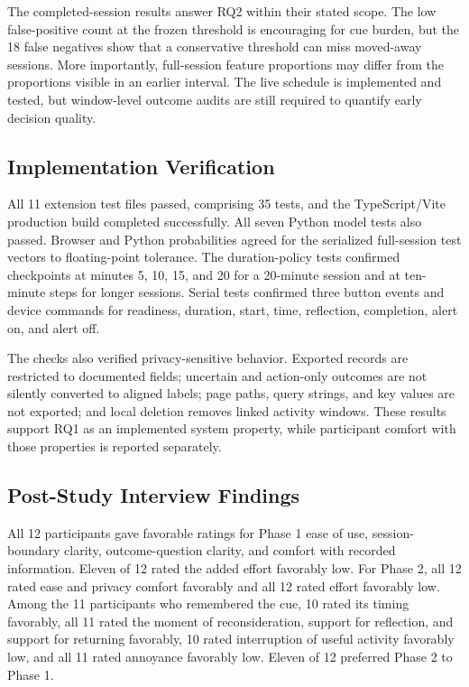 \documentclass[12pt,a4paper]{article}
\begin{document}
The completed-session results answer RQ2 within their stated scope. The low false-positive count at the frozen threshold is encouraging for cue burden, but the 18 false negatives show that a conservative threshold can miss moved-away sessions. More importantly, full-session feature proportions may differ from the proportions visible in an earlier interval. The live schedule is implemented and tested, but window-level outcome audits are still required to quantify early decision quality.

\subsection{Implementation Verification}

All 11 extension test files passed, comprising 35 tests, and the TypeScript/Vite production build completed successfully. All seven Python model tests also passed. Browser and Python probabilities agreed for the serialized full-session test vectors to floating-point tolerance. The duration-policy tests confirmed checkpoints at minutes 5, 10, 15, and 20 for a 20-minute session and at ten-minute steps for longer sessions. Serial tests confirmed three button events and device commands for readiness, duration, start, time, reflection, completion, alert on, and alert off.

The checks also verified privacy-sensitive behavior. Exported records are restricted to documented fields; uncertain and action-only outcomes are not silently converted to aligned labels; page paths, query strings, and key values are not exported; and local deletion removes linked activity windows. These results support RQ1 as an implemented system property, while participant comfort with those properties is reported separately.

\subsection{Post-Study Interview Findings}

All 12 participants gave favorable ratings for Phase 1 ease of use, session-boundary clarity, outcome-question clarity, and comfort with recorded information. Eleven of 12 rated the added effort favorably low. For Phase 2, all 12 rated ease and privacy comfort favorably and all 12 rated effort favorably low. Among the 11 participants who remembered the cue, 10 rated its timing favorably, all 11 rated the moment of reconsideration, support for reflection, and support for returning favorably, 10 rated interruption of useful activity favorably low, and all 11 rated annoyance favorably low. Eleven of 12 preferred Phase 2 to Phase 1.
\end{document}
